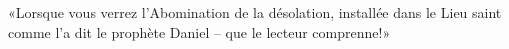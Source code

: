 \encetemps \jesusdisciples
	«Lorsque vous verrez l’Abomination de la désolation,
	installée dans le Lieu saint comme l’a dit le prophète Daniel – 
	que le lecteur comprenne!»
